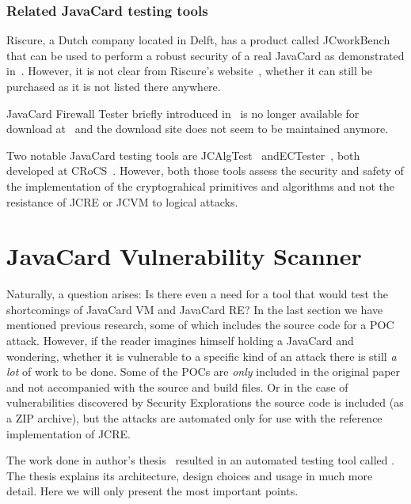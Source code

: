 \documentclass{../llncs/llncs}
\begin{document}
\subsubsection{Related JavaCard testing tools}
Riscure, a Dutch company located in Delft, has a product called JCworkBench that can be used to perform a robust security of a real JavaCard as demonstrated in~\cite{jcworkbench,riscurejcworkbenchpdf}. However, it is not clear from Riscure's website~\cite{riscureweb}, whether it can still be purchased as it is not listed there anywhere.\footnotemark


JavaCard Firewall Tester briefly introduced in~\cite{Mostowski07testingthe} is no longer available for download at~\cite{firewalltester} and the download site does not seem to be maintained anymore.

Two notable JavaCard testing tools are JCAlgTest~\cite{jcalgtest} and\linebreak ECTester~\cite{ectester}, both developed at CRoCS~\cite{crocsweb}. However, both those tools assess the security and safety of the implementation of the cryptograhical primitives and algorithms and not the resistance of JCRE or JCVM to logical attacks.

\section{JavaCard Vulnerability Scanner}\label{sec:javacard-vulnerability-scanner}
Naturally, a question arises: Is there even a need for a tool that would test the shortcomings of JavaCard VM and JavaCard RE?  In the last section we have mentioned previous research, some of which includes the source code for a POC attack. However, if the reader imagines himself holding a JavaCard and wondering, whether it is vulnerable to a specific kind of an attack there is still \textit{a lot} of work to be done. Some of the POCs are \textit{only} included in the original paper and not accompanied with the source and build files. Or in the case of vulnerabilities discovered by Security Explorations the source code is included (as a ZIP archive), but the attacks are automated only for use with the reference implementation of JCRE.

    The work done in author's thesis~\cite{Kvapil2020thesis} resulted in an automated testing tool called \projectname. The thesis explains its architecture, design choices and usage in much more detail. Here we will only present the most important points.
    
\end{document}
